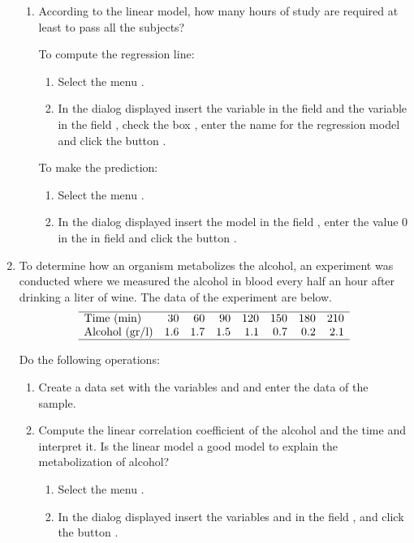 \begin{enumerate}[leftmargin=*]
\begin{enumerate}
\item According to the linear model, how many hours of study are required at least to pass all the subjects?
\begin{indication}
To compute the regression line:
\begin{enumerate}
\item Select the menu .
\item In the dialog displayed insert the variable  in the field  and
the variable  in the field , check the box , enter the name  for the regression model
and click the button .
\end{enumerate}
To make the prediction:
\begin{enumerate}
\item Select the menu .
\item In the dialog displayed insert the model  in
the field , enter the value 0 in the in field  and click the button
.
\end{enumerate}
\end{indication}
\end{enumerate}


\item To determine how an organism metabolizes the alcohol, an experiment was conducted where we measured the
alcohol in blood every half an hour after drinking a liter of wine.
The data of the experiment are below.
\[
\begin{array}{lrrrrrrr}
\hline 
\mbox{Time (min)} & 30 & 60 & 90 & 120 & 150 & 180 & 210\\ 
\mbox{Alcohol (gr/l)} & 1.6 & 1.7 & 1.5 & 1.1 & 0.7 & 0.2 & 2.1\\
\hline
\end{array}
\]

Do the following operations:
\begin{enumerate}
\item Create a data set with the variables  and  and enter the data of the sample.
\item Compute the linear correlation coefficient of the alcohol and the time and interpret it.
Is the linear model a good model to explain the metabolization of alcohol?
\begin{indication}
\begin{enumerate}
\item Select the menu .
\item In the dialog displayed insert the variables  and  in the field , and click the button .
\end{enumerate}
\end{indication}


\end{enumerate}
\end{enumerate}

